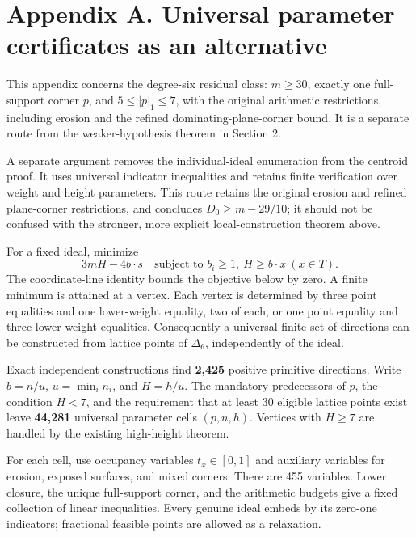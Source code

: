 \documentclass[
  11pt,
  a4paper,
]{article}
\let\oldsection\section
\renewcommand{\section}{\Needspace{7\baselineskip}\oldsection}
\begin{document}
\hypertarget{appendix-a.-universal-parameter-certificates-as-an-alternative}{%
\section{Appendix A. Universal parameter certificates as an
alternative}\label{appendix-a.-universal-parameter-certificates-as-an-alternative}}

This appendix concerns the degree-six residual class: \(m\ge30\),
exactly one full-support corner \(p\), and \(5\le|p|_1\le7\), with the
original arithmetic restrictions, including erosion and the refined
dominating-plane-corner bound. It is a separate route from the
weaker-hypothesis theorem in Section 2.

A separate argument removes the individual-ideal enumeration from the
centroid proof. It uses universal indicator inequalities and retains
finite verification over weight and height parameters. This route
retains the original erosion and refined plane-corner restrictions, and
concludes \(D_0\ge m-29/10\); it should not be confused with the
stronger, more explicit local-construction theorem above.

For a fixed ideal, minimize \[
3mH-4b\cdot s
\quad\text{subject to }b_i\ge1,\ H\ge b\cdot x\ (x\in T).
\] The coordinate-line identity bounds the objective below by zero. A
finite minimum is attained at a vertex. Each vertex is determined by
three point equalities and one lower-weight equality, two of each, or
one point equality and three lower-weight equalities. Consequently a
universal finite set of directions can be constructed from lattice
points of \(\Delta_6\), independently of the ideal.

Exact independent constructions find \textbf{2,425} positive primitive
directions. Write \(b=n/u\), \(u=\min_i n_i\), and \(H=h/u\). The
mandatory predecessors of \(p\), the condition \(H<7\), and the
requirement that at least 30 eligible lattice points exist leave
\textbf{44,281} universal parameter cells \((p,n,h)\). Vertices with
\(H\ge7\) are handled by the existing high-height theorem.

For each cell, use occupancy variables \(t_x\in[0,1]\) and auxiliary
variables for erosion, exposed surfaces, and mixed corners. There are
455 variables. Lower closure, the unique full-support corner, and the
arithmetic budgets give a fixed collection of linear inequalities. Every
genuine ideal embeds by its zero-one indicators; fractional feasible
points are allowed as a relaxation.
\end{document}
